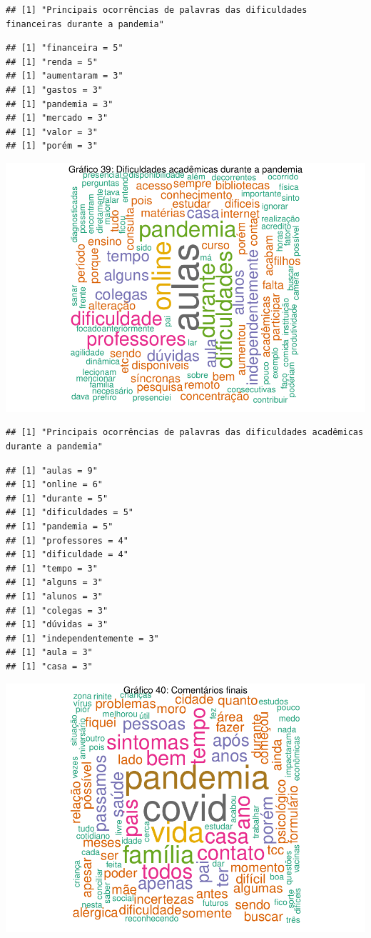 \documentclass[
]{article}
\begin{document}
\begin{verbatim}
## [1] "Principais ocorrências de palavras das dificuldades financeiras durante a pandemia"
\end{verbatim}

\begin{verbatim}
## [1] "financeira = 5"
## [1] "renda = 5"
## [1] "aumentaram = 3"
## [1] "gastos = 3"
## [1] "pandemia = 3"
## [1] "mercado = 3"
## [1] "valor = 3"
## [1] "porém = 3"
\end{verbatim}

\includegraphics{consequencias-oriundas-da-pandemia-v1.0_files/figure-latex/grafico-sobrou-1.pdf}

\begin{verbatim}
## [1] "Principais ocorrências de palavras das dificuldades acadêmicas durante a pandemia"
\end{verbatim}

\begin{verbatim}
## [1] "aulas = 9"
## [1] "online = 6"
## [1] "durante = 5"
## [1] "dificuldades = 5"
## [1] "pandemia = 5"
## [1] "professores = 4"
## [1] "dificuldade = 4"
## [1] "tempo = 3"
## [1] "alguns = 3"
## [1] "alunos = 3"
## [1] "colegas = 3"
## [1] "dúvidas = 3"
## [1] "independentemente = 3"
## [1] "aula = 3"
## [1] "casa = 3"
\end{verbatim}

\includegraphics{consequencias-oriundas-da-pandemia-v1.0_files/figure-latex/grafico-40-1.pdf}
\end{document}
